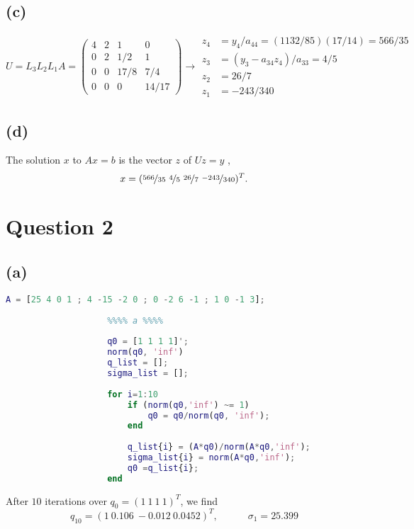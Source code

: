 \documentclass[12pt]{article}
\begin{document}
		\subsection*{(c)}
			$$U = L_{3}L_{2} L_{1}A 
			  = \begin{pmatrix}
			4 & 2 & 1 & 0 \\ 
			0 & 2 & 1/2 & 1 \\
			0 & 0 & 17/8 & 7/4 \\
			0 & 0 & 0 & 14/17
			\end{pmatrix} \to \begin{align*}
				z_{4} &= y_{4}/a_{44} = (1132/85)(17/14) = 566/35 \\
				z_{3} &= (y_{3} - a_{34}z_{4})/a_{33} =4/5 \\
				z_{2} &= 26/7 \\
				z_{1} &= -243/340
			\end{align*}$$
		\subsection*{(d)}
			The solution $x$ to $Ax =b$ is the vector $z$ of $Uz= y $ ,
			$$ x = ( \nicefrac{566}{35} \ \nicefrac{4}{5} \ \nicefrac{26}{7} \ \nicefrac{-243}{340})^{T}.$$
	\section*{Question 2}
		\subsection*{(a)}
				\begin{lstlisting}[language=Matlab, xleftmargin=-20em, showstringspaces=true]
					A = [25 4 0 1 ; 4 -15 -2 0 ; 0 -2 6 -1 ; 1 0 -1 3];
					
					%%%% a %%%%
					
					q0 = [1 1 1 1]';
					norm(q0, 'inf')
					q_list = [];
					sigma_list = [];
					
					for i=1:10 
						if (norm(q0,'inf') ~= 1)
							q0 = q0/norm(q0, 'inf');
						end
					
						q_list{i} = (A*q0)/norm(A*q0,'inf');
						sigma_list{i} = norm(A*q0,'inf');
						q0 =q_list{i};
					end
			\end{lstlisting}
			\midrule 
			
			
			After $10$ iterations over $q_{0}= (1 \ 1 \ 1 \ 1)^{T}$, we find 
			$$ q_{10} = (1 \ 0.106 \ -0.012 \ 0.0452)^{T} , \qquad \quad \sigma_{1} = 25.399 $$
\end{document}
